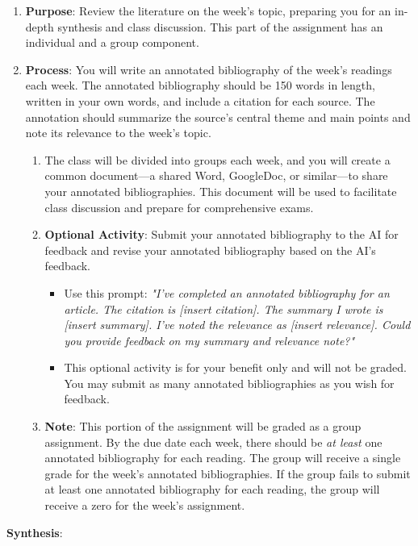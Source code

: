 \documentclass[12pt, letterpaper]{article}
\begin{document}
\begin{enumerate}
    \item \textbf{Purpose}: Review the literature on the week’s topic, preparing you for an in-depth synthesis and class discussion. This part of the assignment has an individual and a group component.
    \item \textbf{Process}: You will write an annotated bibliography of the week's readings each week. The annotated bibliography should be 150 words in length, written in your own words, and include a citation for each source.  The annotation should summarize the source's central theme and main points and note its relevance to the week's topic.
    \begin{enumerate}
        \item The class will be divided into groups each week, and you will create a common document—a shared Word, GoogleDoc, or similar—to share your annotated bibliographies. This document will be used to facilitate class discussion and prepare for comprehensive exams.
        \item \textbf{Optional Activity}: Submit your annotated bibliography to the AI for feedback and revise your annotated bibliography based on the AI's feedback.
            \begin{itemize}
                \item Use this prompt: 
                \textit{"I've completed an annotated bibliography for an article. The citation is [insert citation]. The summary I wrote is [insert summary]. I've noted the relevance as [insert relevance]. Could you provide feedback on my summary and relevance note?"}
                \item This optional activity is for your benefit only and will not be graded. You may submit as many annotated bibliographies as you wish for feedback. 
            \end{itemize}
        \item \textbf{Note}: This portion of the assignment will be graded as a group assignment. By the due date each week, there should be \textit{at least} one annotated bibliography for each reading. The group will receive a single grade for the week's annotated bibliographies. If the group fails to submit at least one annotated bibliography for each reading, the group will receive a zero for the week's assignment.
    \end{enumerate}
\end{enumerate}

\textbf{Synthesis}:
\end{document}
